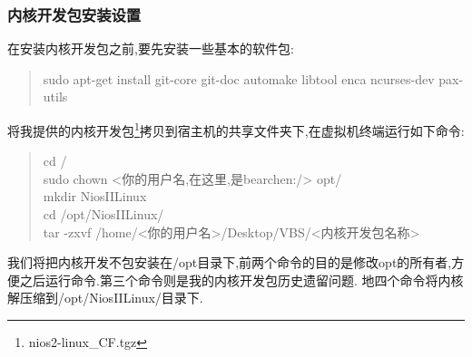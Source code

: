\documentclass[12pt,a4paper,titlepage]{article}
\begin{document}
\subsubsection{内核开发包安装设置}
在安装内核开发包之前,要先安装一些基本的软件包:
\begin{verse}
sudo apt-get install git-core git-doc automake libtool enca ncurses-dev pax-utils
\end{verse}

将我提供的内核开发包\footnote{nios2-linux\_CF.tgz}拷贝到{宿主机}的共享文件夹下,在{虚拟机终端}运行如下命令:
\begin{verse}
cd /\\sudo chown <你的用户名,在这里,是bearchen:/> opt/\\mkdir NiosIILinux\\cd /opt/NiosIILinux/\\
tar -zxvf /home/<你的用户名>/Desktop/VBS/<内核开发包名称>
\end{verse}
我们将把内核开发不包安装在/opt目录下,前两个命令的目的是修改opt的所有者,方便之后运行命令.第三个命令则是我的内核开发包历史遗留问题.
地四个命令将内核解压缩到/opt/NiosIILinux/目录下.
\end{document}
